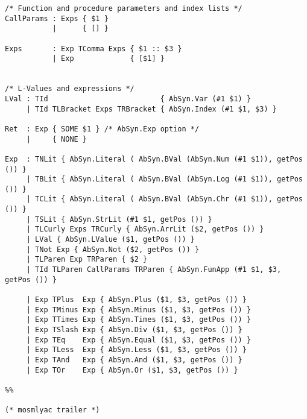 \begin{lstlisting}[style=MLStyle]
/* Function and procedure parameters and index lists */
CallParams : Exps { $1 }
           |      { [] }

Exps       : Exp TComma Exps { $1 :: $3 }
           | Exp             { [$1] }


/* L-Values and expressions */
LVal : TId                          { AbSyn.Var (#1 $1) }
     | TId TLBracket Exps TRBracket { AbSyn.Index (#1 $1, $3) }

Ret  : Exp { SOME $1 } /* AbSyn.Exp option */
     |     { NONE }

Exp  : TNLit { AbSyn.Literal ( AbSyn.BVal (AbSyn.Num (#1 $1)), getPos ()) }
     | TBLit { AbSyn.Literal ( AbSyn.BVal (AbSyn.Log (#1 $1)), getPos ()) }
     | TCLit { AbSyn.Literal ( AbSyn.BVal (AbSyn.Chr (#1 $1)), getPos ()) }
     | TSLit { AbSyn.StrLit (#1 $1, getPos ()) }
     | TLCurly Exps TRCurly { AbSyn.ArrLit ($2, getPos ()) }
     | LVal { AbSyn.LValue ($1, getPos ()) }
     | TNot Exp { AbSyn.Not ($2, getPos ()) }
     | TLParen Exp TRParen { $2 }
     | TId TLParen CallParams TRParen { AbSyn.FunApp (#1 $1, $3, getPos ()) }

     | Exp TPlus  Exp { AbSyn.Plus ($1, $3, getPos ()) }
     | Exp TMinus Exp { AbSyn.Minus ($1, $3, getPos ()) }
     | Exp TTimes Exp { AbSyn.Times ($1, $3, getPos ()) }
     | Exp TSlash Exp { AbSyn.Div ($1, $3, getPos ()) }
     | Exp TEq    Exp { AbSyn.Equal ($1, $3, getPos ()) }
     | Exp TLess  Exp { AbSyn.Less ($1, $3, getPos ()) }
     | Exp TAnd   Exp { AbSyn.And ($1, $3, getPos ()) }
     | Exp TOr    Exp { AbSyn.Or ($1, $3, getPos ()) }

%%

(* mosmlyac trailer *)
\end{lstlisting}
